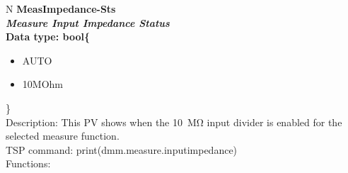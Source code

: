 \documentclass[openany]{article}
\begin{document}
		\begin{tabular}{N}
			\hline
			\bfseries MeasImpedance-Sts\label{pv:measimpedance-sts} \\ \hline
			\emph{Measure Input Impedance Status} \\
			Data type: bool\{\begin{itemize}[noitemsep]
				\small
				\item[] AUTO
				\item[] 10MOhm
			\end{itemize}\} \\
			Description: This PV shows when the \SI{10}{\mega\ohm} input divider is enabled for the selected measure function. \\
			TSP command: print(dmm.measure.inputimpedance) \\
			Functions: \\
			\arrayrulecolor{\FuncTableBorderColor}

		\end{tabular}
\end{document}
